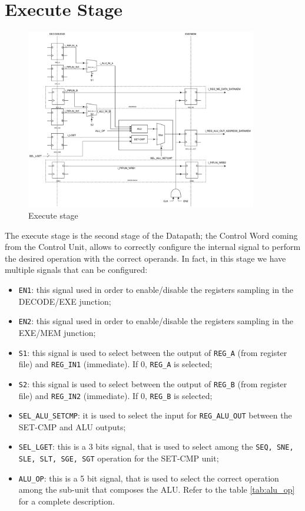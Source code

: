 \chapter{Execute Stage}

\begin{figure}[H]   
	\centering
	\includegraphics[width=0.9\textwidth]{chapters/5_ExecuteStage/images/exe_stage.pdf}
	\caption{Execute stage}
	\label{fig:execute-stage}
\end{figure}

The execute stage is the second stage of the Datapath; the Control Word coming from the Control Unit, allows to correctly configure the internal signal to perform the desired operation with the correct operands. In fact, in this stage we have multiple signals that can be configured:
\begin{itemize}
	\itemsep0sp
	\item \texttt{EN1}: this signal used in order to enable/disable the registers sampling in the DECODE/EXE junction;
	\item \texttt{EN2}: this signal used in order to enable/disable the registers sampling in the EXE/MEM junction;
	\item \texttt{S1}: this signal is used to select between the output of \texttt{REG\_A} (from register file) and \texttt{REG\_IN1} (immediate). If 0, \texttt{REG\_A} is selected;
	\item \texttt{S2}: this signal is used to select between the output of \texttt{REG\_B} (from register file) and \texttt{REG\_IN2} (immediate). If 0, \texttt{REG\_B} is selected;
	\item \texttt{SEL\_ALU\_SETCMP}: it is used to select the input for \texttt{REG\_ALU\_OUT} between the SET-CMP and ALU outputs;
	\item \texttt{SEL\_LGET}: this is a 3 bits signal, that is used to select among the \texttt{SEQ, SNE, SLE, SLT, SGE, SGT} operation for the SET-CMP unit;
 	\item \texttt{ALU\_OP}: this is a 5 bit signal, that is used to select the correct operation among the sub-unit that composes the ALU. Refer to the table \ref{tab:alu_op} for a complete description.
	
\end{itemize}

